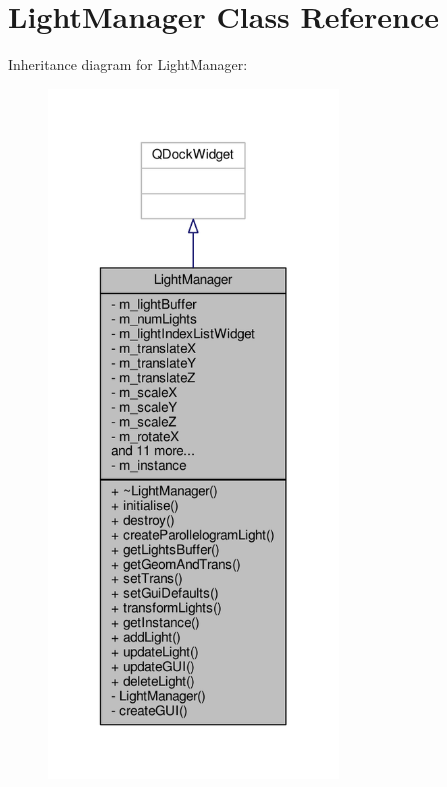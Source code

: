 \hypertarget{class_light_manager}{\section{Light\-Manager Class Reference}
\label{class_light_manager}
}


Inheritance diagram for Light\-Manager\-:
\nopagebreak
\begin{figure}[H]
\begin{center}
\leavevmode
\includegraphics[width=218pt]{class_light_manager__inherit__graph}
\end{center}
\end{figure}


